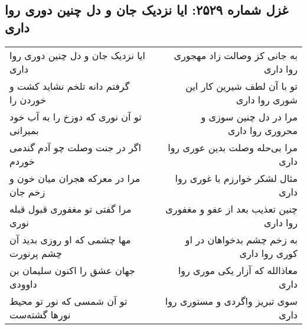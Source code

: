 \begin{center}
\section*{غزل شماره ۲۵۲۹: ایا نزدیک جان و دل چنین دوری روا داری}
\label{sec:2529}
\begin{longtable}{l p{0.5cm} r}
ایا نزدیک جان و دل چنین دوری روا داری
&&
به جانی کز وصالت زاد مهجوری روا داری
\\
گرفتم دانه تلخم نشاید کشت و خوردن را
&&
تو با آن لطف شیرین کار این شوری روا داری
\\
تو آن نوری که دوزخ را به آب خود بمیرانی
&&
مرا در دل چنین سوزی و محروری روا داری
\\
اگر در جنت وصلت چو آدم گندمی خوردم
&&
مرا بی‌حله وصلت بدین عوری روا داری
\\
مرا در معرکه هجران میان خون و زخم جان
&&
مثال لشکر خوارزم با غوری روا داری
\\
مرا گفتی تو مغفوری قبول قبله نوری
&&
چنین تعذیب بعد از عفو و مغفوری روا داری
\\
مها چشمی که او روزی بدید آن چشم پرنورت
&&
به زخم چشم بدخواهان در او کوری روا داری
\\
جهان عشق را اکنون سلیمان بن داوودی
&&
معاذالله که آزار یکی موری روا داری
\\
تو آن شمسی که نور تو محیط نورها گشته‌ست
&&
سوی تبریز واگردی و مستوری روا داری
\\
\end{longtable}
\end{center}
